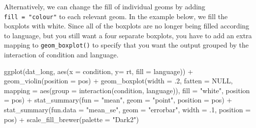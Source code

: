 \documentclass[
  english,
  doc,floatsintext]{apa6}
\newenvironment{Shaded}{\begin{snugshade}}{\end{snugshade}}
\newcommand{\AttributeTok}[1]{\textcolor[rgb]{0.77,0.63,0.00}{#1}}
\newcommand{\ConstantTok}[1]{\textcolor[rgb]{0.00,0.00,0.00}{#1}}
\newcommand{\DecValTok}[1]{\textcolor[rgb]{0.00,0.00,0.81}{#1}}
\newcommand{\FunctionTok}[1]{\textcolor[rgb]{0.00,0.00,0.00}{#1}}
\newcommand{\NormalTok}[1]{#1}
\newcommand{\SpecialCharTok}[1]{\textcolor[rgb]{0.00,0.00,0.00}{#1}}
\newcommand{\StringTok}[1]{\textcolor[rgb]{0.31,0.60,0.02}{#1}}
\begin{document}
Alternatively, we can change the fill of individual geoms by adding \texttt{fill\ =\ "colour"} to each relevant geom. In the example below, we fill the boxplots with white. Since all of the boxplots are no longer being filled according to language, but you still want a four separate boxplots, you have to add an extra mapping to \texttt{geom\_boxplot()} to specify that you want the output grouped by the interaction of condition and language.

\begin{Shaded}
\begin{Highlighting}[]
\FunctionTok{ggplot}\NormalTok{(dat\_long, }\FunctionTok{aes}\NormalTok{(}\AttributeTok{x =}\NormalTok{ condition, }\AttributeTok{y=}\NormalTok{ rt, }\AttributeTok{fill =}\NormalTok{ language)) }\SpecialCharTok{+}
  \FunctionTok{geom\_violin}\NormalTok{(}\AttributeTok{position =}\NormalTok{ pos) }\SpecialCharTok{+}
  \FunctionTok{geom\_boxplot}\NormalTok{(}\AttributeTok{width =}\NormalTok{ .}\DecValTok{2}\NormalTok{, }\AttributeTok{fatten =} \ConstantTok{NULL}\NormalTok{, }
               \AttributeTok{mapping =} \FunctionTok{aes}\NormalTok{(}\AttributeTok{group =} \FunctionTok{interaction}\NormalTok{(condition, language)),}
               \AttributeTok{fill =} \StringTok{"white"}\NormalTok{,}
               \AttributeTok{position =}\NormalTok{ pos) }\SpecialCharTok{+}
  \FunctionTok{stat\_summary}\NormalTok{(}\AttributeTok{fun =} \StringTok{"mean"}\NormalTok{, }
               \AttributeTok{geom =} \StringTok{"point"}\NormalTok{, }
               \AttributeTok{position =}\NormalTok{ pos) }\SpecialCharTok{+}
  \FunctionTok{stat\_summary}\NormalTok{(}\AttributeTok{fun.data =} \StringTok{"mean\_se"}\NormalTok{, }
               \AttributeTok{geom =} \StringTok{"errorbar"}\NormalTok{, }
               \AttributeTok{width =}\NormalTok{ .}\DecValTok{1}\NormalTok{,}
               \AttributeTok{position =}\NormalTok{ pos) }\SpecialCharTok{+}
  \FunctionTok{scale\_fill\_brewer}\NormalTok{(}\AttributeTok{palette =} \StringTok{"Dark2"}\NormalTok{)}
\end{Highlighting}
\end{Shaded}
\end{document}
